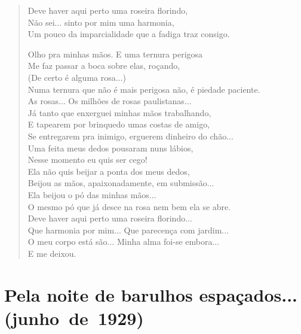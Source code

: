\begin{verse}
Deve haver aqui perto uma roseira florindo,\\
Não sei... sinto por mim uma harmonia,\\
Um pouco da imparcialidade que a fadiga traz consigo.

Olho pra minhas mãos. E uma ternura perigosa\\
Me faz passar a boca sobre elas, roçando,\\
(De certo é alguma rosa...)\\
Numa ternura que não é mais perigosa não, é piedade paciente.\\
As rosas... Os milhões de rosas paulistanas...\\
Já tanto que enxerguei minhas mãos trabalhando,\\
E tapearem por brinquedo umas costas de amigo,\\
Se entregarem pra inimigo, erguerem dinheiro do chão...\\
Uma feita meus dedos pousaram nuns lábios,\\
Nesse momento eu quis ser cego!\\
Ela não quis beijar a ponta dos meus dedos,\\
Beijou as mãos, apaixonadamente, em submissão...\\
Ela beijou o pó das minhas mãos...\\
O mesmo pó que já desce na rosa nem bem ela se abre.\\
Deve haver aqui perto uma roseira florindo...\\
Que harmonia por mim... Que parecença com jardim...\\
O meu corpo está são... Minha alma foi-se embora...\\
E me deixou.
\end{verse}

\pagebreak
{}
\section{Pela noite de barulhos espaçados...\break (junho~de~1929)}


